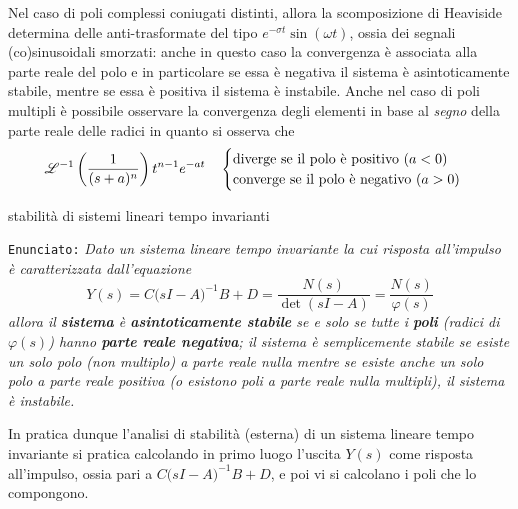 	Nel caso di poli complessi coniugati distinti, allora la scomposizione di Heaviside determina delle anti-trasformate del tipo $e^{-\sigma t} \sin(\omega t)$, ossia dei segnali (co)sinusoidali smorzati: anche in questo caso la convergenza è associata alla parte reale del polo e in particolare se essa è negativa il sistema è asintoticamente stabile, mentre se essa è positiva il sistema è instabile. Anche nel caso di poli multipli è possibile osservare la convergenza degli elementi in base al \textit{segno} della parte reale delle radici in quanto si osserva che
	\[ \mathscr {L}^{-1} \left( \frac 1 {(s+a)^n} \right) t^{n-1} e^{-at} \quad \begin{cases}
		\textrm{diverge se il polo è positivo ($a<0$)} \\
		\textrm{converge se il polo è negativo ($a>0$)} 
	\end{cases} \]	
	
	\begin{teorema}{stabilità di sistemi lineari tempo invarianti}  
		
		\texttt{Enunciato:}  { \itshape Dato  un sistema lineare tempo invariante la cui risposta all'impulso è caratterizzata dall'equazione
		\[ Y(s) = C \big(sI-A\big)^{-1} B + D = \frac{N(s)}{\det(sI-A)} = \frac{N(s)}{\varphi(s)} \]  \label{teor:lti:stabilita}
		allora il \textbf{sistema} è \textbf{asintoticamente stabile} se e solo se tutte i \textbf{poli} (radici di $\varphi(s)$) hanno \textbf{parte reale negativa}; il sistema è semplicemente stabile se esiste un solo polo (non multiplo) a parte reale nulla mentre se esiste anche un solo polo a parte reale positiva (o esistono poli a parte reale nulla multipli), il sistema è instabile.}
	\end{teorema}

	In pratica dunque l'analisi di stabilità (esterna) di un sistema lineare tempo invariante si pratica calcolando in primo luogo l'uscita $Y(s)$ come risposta all'impulso, ossia pari a $C \big(sI-A\big)^{-1} B + D$, e poi vi si calcolano i poli che lo compongono.
	
